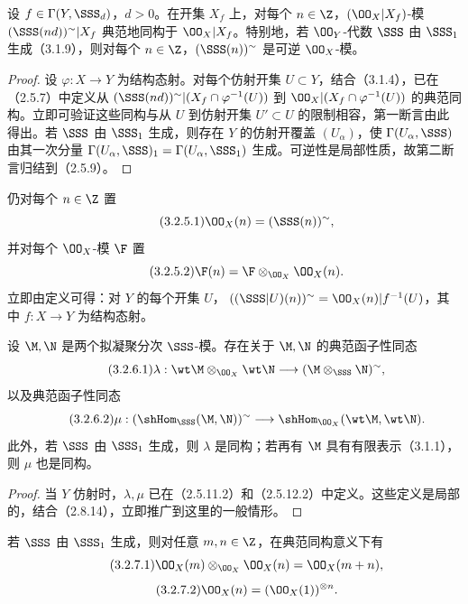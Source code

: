 设 $f\in\Gamma(Y,\SSS_d)$，$d>0$。在开集 $X_f$ 上，对每个 $n\in\Z$，$(\OO_X|X_f)$-模
$(\SSS(nd))^\sim|X_f$ 典范地同构于 $\OO_X|X_f$。特别地，若 $\OO_Y$-代数 $\SSS$ 由 $\SSS_1$ 生成（3.1.9），则对每个 $n\in\Z$，$(\SSS(n))^\sim$ 是可逆 $\OO_X$-模。
\begin{proof}
设 $\varphi:X\to Y$ 为结构态射。对每个仿射开集 $U\subset Y$，结合（3.1.4），已在（2.5.7）中定义从
$(\SSS(nd))^\sim|(X_f\cap\varphi^{-1}(U))$ 到
$\OO_X|(X_f\cap\varphi^{-1}(U))$ 的典范同构。立即可验证这些同构与从 $U$ 到仿射开集 $U'\subset U$ 的限制相容，第一断言由此得出。若 $\SSS$ 由 $\SSS_1$ 生成，则存在 $Y$ 的仿射开覆盖 $(U_\alpha)$，使 $\Gamma(U_\alpha,\SSS)$ 由其一次分量 $\Gamma(U_\alpha,\SSS)_1=\Gamma(U_\alpha,\SSS_1)$ 生成。可逆性是局部性质，故第二断言归结到（2.5.9）。
\end{proof}
仍对每个 $n\in\Z$ 置
\begin{equation}\tag{3.2.5.1}\OO_X(n)=(\SSS(n))^\sim,\end{equation}
并对每个 $\OO_X$-模 $\F$ 置
\begin{equation}\tag{3.2.5.2}\F(n)=\F\otimes_{\OO_X}\OO_X(n).\end{equation}
立即由定义可得：对 $Y$ 的每个开集 $U$，
$((\SSS|U)(n))^\sim=\OO_X(n)|f^{-1}(U)$，其中 $f:X\to Y$ 为结构态射。

设 $\M,\N$ 是两个拟凝聚分次 $\SSS$-模。存在关于 $\M,\N$ 的典范函子性同态
\begin{equation}\tag{3.2.6.1}
\lambda:\wt\M\otimes_{\OO_X}\wt\N\longrightarrow(\M\otimes_{\SSS}\N)^\sim,
\end{equation}
以及典范函子性同态
\begin{equation}\tag{3.2.6.2}
\mu:(\shHom_{\SSS}(\M,\N))^\sim\longrightarrow\shHom_{\OO_X}(\wt\M,\wt\N).
\end{equation}
此外，若 $\SSS$ 由 $\SSS_1$ 生成，则 $\lambda$ 是同构；若再有 $\M$ 具有有限表示（3.1.1），则 $\mu$ 也是同构。
\begin{proof}
当 $Y$ 仿射时，$\lambda,\mu$ 已在（2.5.11.2）和（2.5.12.2）中定义。这些定义是局部的，结合（2.8.14），立即推广到这里的一般情形。
\end{proof}

若 $\SSS$ 由 $\SSS_1$ 生成，则对任意 $m,n\in\Z$，在典范同构意义下有
\begin{equation}\tag{3.2.7.1}\OO_X(m)\otimes_{\OO_X}\OO_X(n)=\OO_X(m+n),\end{equation}
\begin{equation}\tag{3.2.7.2}\OO_X(n)=(\OO_X(1))^{\otimes n}.\end{equation}

